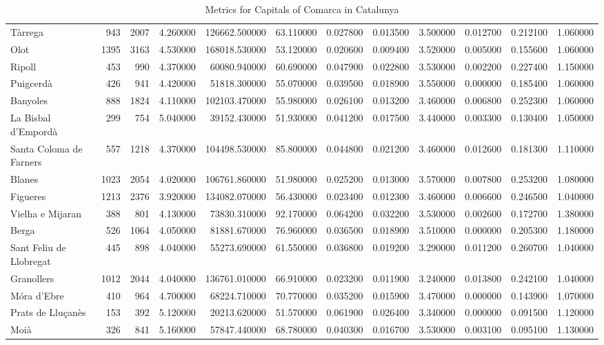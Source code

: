 \documentclass{article}
\begin{document}
\begin{table}[ht]
\begin{tabular}{lrrrrrrrrrrr}
Tàrrega & 943 & 2007 & 4.260000 & 126662.500000 & 63.110000 & 0.027800 & 0.013500 & 3.500000 & 0.012700 & 0.212100 & 1.060000 \\
Olot & 1395 & 3163 & 4.530000 & 168018.530000 & 53.120000 & 0.020600 & 0.009400 & 3.520000 & 0.005000 & 0.155600 & 1.060000 \\
Ripoll & 453 & 990 & 4.370000 & 60080.940000 & 60.690000 & 0.047900 & 0.022800 & 3.530000 & 0.002200 & 0.227400 & 1.150000 \\
Puigcerdà & 426 & 941 & 4.420000 & 51818.300000 & 55.070000 & 0.039500 & 0.018900 & 3.550000 & 0.000000 & 0.185400 & 1.060000 \\
Banyoles & 888 & 1824 & 4.110000 & 102103.470000 & 55.980000 & 0.026100 & 0.013200 & 3.460000 & 0.006800 & 0.252300 & 1.060000 \\
La Bisbal d'Empordà & 299 & 754 & 5.040000 & 39152.430000 & 51.930000 & 0.041200 & 0.017500 & 3.440000 & 0.003300 & 0.130400 & 1.050000 \\
Santa Coloma de Farners & 557 & 1218 & 4.370000 & 104498.530000 & 85.800000 & 0.044800 & 0.021200 & 3.460000 & 0.012600 & 0.181300 & 1.110000 \\
Blanes & 1023 & 2054 & 4.020000 & 106761.860000 & 51.980000 & 0.025200 & 0.013000 & 3.570000 & 0.007800 & 0.253200 & 1.080000 \\
Figueres & 1213 & 2376 & 3.920000 & 134082.070000 & 56.430000 & 0.023400 & 0.012300 & 3.460000 & 0.006600 & 0.246500 & 1.040000 \\
Vielha e Mijaran & 388 & 801 & 4.130000 & 73830.310000 & 92.170000 & 0.064200 & 0.032200 & 3.530000 & 0.002600 & 0.172700 & 1.380000 \\
Berga & 526 & 1064 & 4.050000 & 81881.670000 & 76.960000 & 0.036500 & 0.018900 & 3.510000 & 0.000000 & 0.205300 & 1.180000 \\
Sant Feliu de Llobregat & 445 & 898 & 4.040000 & 55273.690000 & 61.550000 & 0.036800 & 0.019200 & 3.290000 & 0.011200 & 0.260700 & 1.040000 \\
Granollers & 1012 & 2044 & 4.040000 & 136761.010000 & 66.910000 & 0.023200 & 0.011900 & 3.240000 & 0.013800 & 0.242100 & 1.040000 \\
Móra d'Ebre & 410 & 964 & 4.700000 & 68224.710000 & 70.770000 & 0.035200 & 0.015900 & 3.470000 & 0.000000 & 0.143900 & 1.070000 \\
Prats de Lluçanès & 153 & 392 & 5.120000 & 20213.620000 & 51.570000 & 0.061900 & 0.026400 & 3.340000 & 0.000000 & 0.091500 & 1.120000 \\
Moià & 326 & 841 & 5.160000 & 57847.440000 & 68.780000 & 0.040300 & 0.016700 & 3.530000 & 0.003100 & 0.095100 & 1.130000 \\
\bottomrule
\end{tabular}
\caption{Metrics for Capitals of Comarca in Catalunya}
\label{tab:metrics}
\end{table}
\end{document}
